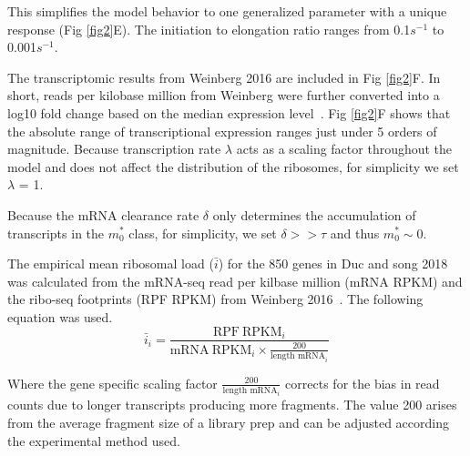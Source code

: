 \documentclass[10pt,letterpaper]{article}
\newcommand{\MRL}{\ensuremath{\bar{i}}\xspace}
\begin{document}
This simplifies the model behavior to one generalized parameter with a unique response (Fig \ref{fig2}E).  The initiation to elongation ratio ranges from 0.1$s^{-1}$ to 0.001$s^{-1}$.

The transcriptomic results from Weinberg 2016 are included in Fig \ref{fig2}F. In short, reads per kilobase million from Weinberg were further converted into a log10 fold change based on the median expression level~\cite{RN29}. Fig \ref{fig2}F shows that the absolute range of transcriptional expression ranges just under 5 orders of magnitude. Because transcription rate $\lambda$ acts as a scaling factor throughout the model and does not affect the distribution of the ribosomes, for simplicity we set $\lambda$ = 1.

Because the mRNA clearance rate $\delta$ only determines the accumulation of transcripts in the  $m_0^*$  class, for simplicity, we set $\delta >> \tau$ and thus  $m_0^* \sim 0$.
 
The empirical mean ribosomal load (\MRL) for the 850 genes in Duc and song 2018 was calculated from the mRNA-seq read per kilbase million (mRNA RPKM) and the ribo-seq footprints (RPF RPKM) from Weinberg 2016~\cite{RN29}. The following equation was used.
\begin{equation}\label{eq:MRL}
	\MRL_i = \frac{\text{RPF} \: \text{RPKM}_i}{\text{mRNA} \:  \text{RPKM}_i  \times \frac{200}{\text{length mRNA}_i}}
\end{equation}

Where the gene specific scaling factor $\frac{200}{\text{length mRNA}_i}$ corrects for the bias in read counts due to longer transcripts producing more fragments. The value 200 arises from the average fragment size of a library prep and can be adjusted according the experimental method used.



\end{document}
